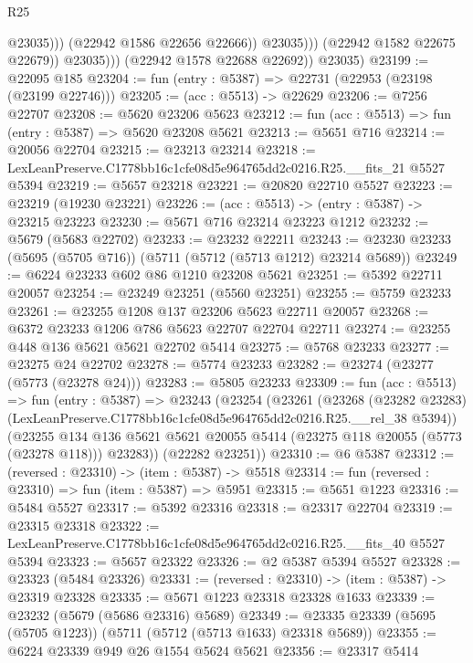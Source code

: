 \begin{lexlean}{R25}
\begin{coremodule}
                              @23035)))
                        (@22942 @1586 @22656 @22666))
                      @23035)))
                (@22942 @1582 @22675 @22679))
              @23035)))
        (@22942 @1578 @22688 @22692))
      @23035)
@23199 := @22095 @185
@23204 := fun (entry : @5387) => @22731 (@22953 (@23198 (@23199 @22746)))
@23205 := (acc : @5513) -> @22629
@23206 := @7256 @22707
@23208 := @5620 @23206 @5623
@23212 := fun (acc : @5513) => fun (entry : @5387) => @5620 @23208 @5621
@23213 := @5651 @716
@23214 := @20056 @22704
@23215 := @23213 @23214
@23218 := LexLeanPreserve.C1778bb16c1cfe08d5e964765dd2c0216.R25.__fits_21 @5527 @5394
@23219 := @5657 @23218
@23221 := @20820 @22710 @5527
@23223 := @23219 (@19230 @23221)
@23226 := (acc : @5513) -> (entry : @5387) -> @23215 @23223
@23230 := @5671 @716 @23214 @23223 @1212
@23232 := @5679 (@5683 @22702)
@23233 := @23232 @22211
@23243 := @23230 @23233 (@5695 (@5705 @716)) (@5711 (@5712 (@5713 @1212) @23214 @5689))
@23249 := @6224 @23233 @602 @86 @1210 @23208 @5621
@23251 := @5392 @22711 @20057
@23254 := @23249 @23251 (@5560 @23251)
@23255 := @5759 @23233
@23261 := @23255 @1208 @137 @23206 @5623 @22711 @20057
@23268 := @6372 @23233 @1206 @786 @5623 @22707 @22704 @22711
@23274 := @23255 @448 @136 @5621 @5621 @22702 @5414
@23275 := @5768 @23233
@23277 := @23275 @24 @22702
@23278 := @5774 @23233
@23282 := @23274 (@23277 (@5773 (@23278 @24)))
@23283 := @5805 @23233
@23309 := fun (acc : @5513) =>
  fun (entry : @5387) =>
  @23243
    (@23254
      (@23261
        (@23268
          (@23282 @23283)
          (LexLeanPreserve.C1778bb16c1cfe08d5e964765dd2c0216.R25.__rel_38 @5394))
        (@23255
          @134
          @136
          @5621
          @5621
          @20055
          @5414
          (@23275 @118 @20055 (@5773 (@23278 @118)))
          @23283))
      (@22282 @23251))
@23310 := @6 @5387
@23312 := (reversed : @23310) -> (item : @5387) -> @5518
@23314 := fun (reversed : @23310) => fun (item : @5387) => @5951
@23315 := @5651 @1223
@23316 := @5484 @5527
@23317 := @5392 @23316
@23318 := @23317 @22704
@23319 := @23315 @23318
@23322 := LexLeanPreserve.C1778bb16c1cfe08d5e964765dd2c0216.R25.__fits_40 @5527 @5394
@23323 := @5657 @23322
@23326 := @2 @5387 @5394 @5527
@23328 := @23323 (@5484 @23326)
@23331 := (reversed : @23310) -> (item : @5387) -> @23319 @23328
@23335 := @5671 @1223 @23318 @23328 @1633
@23339 := @23232 (@5679 (@5686 @23316) @5689)
@23349 := @23335 @23339 (@5695 (@5705 @1223)) (@5711 (@5712 (@5713 @1633) @23318 @5689))
@23355 := @6224 @23339 @949 @26 @1554 @5624 @5621
@23356 := @23317 @5414

\end{coremodule}
\end{lexlean}
